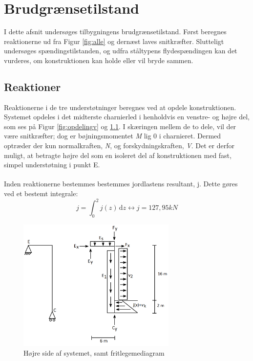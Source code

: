 \chapter{Brudgrænsetilstand}
I dette afsnit undersøges tilbygningens brudgrænsetilstand. Først beregnes reaktionerne ud fra Figur \ref{fig:alle} og dernæst laves snitkræfter. Slutteligt undersøges spændingstilstanden, og udfra ståltypens flydespændingen kan det vurderes, om konstruktionen kan holde eller vil bryde sammen.   

\section{Reaktioner}
Reaktionerne i de tre understøtninger beregnes ved at opdele konstruktionen. Systemet opdeles i det midterste charnierled i henholdvis en venstre- og højre del, som ses på Figur \ref{fig:opdelingv} og \ref{fig:opdelingh}. I skæringen mellem de to dele, vil der være snitkræfter; dog er bøjningsmomentet \textit{M} lig 0 i charnieret. Dermed optræder der kun normalkraften, \textit{N}, og forskydningskraften, \textit{V}. Det er derfor muligt, at betragte højre del som en isoleret del af konstruktionen med fast, simpel understøtning i punkt E.
\\
\\
Inden reaktionerne bestemmes bestemmes jordlastens resultant, j. Dette gøres ved et bestemt integrale: 
\begin{equation}
j = \int_{0}^{2} \! j(z) \, \mathrm{d}z \leftrightarrow j = 127,\!95 kN
\end{equation}

\begin{figure}[H]
	\centering
	\includegraphics[width=0.7\textwidth]{billeder/hojre.png}
	\caption{Højre side af systemet, samt fritlegemediagram}
	\label{fig:opdelingh}
\end{figure}

